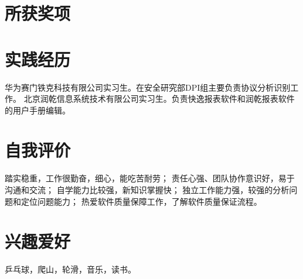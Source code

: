 \documentclass[a4paper]{moderncv}
\begin{document}
\begin{CJK*}{UTF8}{gbsn}
\section{所获奖项}
\section{实践经历}
{华为赛门铁克科技有限公司实习生。在安全研究部DPI组主要负责协议分析识别工作。}
{ 北京润乾信息系统技术有限公司实习生。负责快逸报表软件和润乾报表软件的用户手册编辑。 }

\section{自我评价}
\cvitem{}{}
{
踏实稳重，工作很勤奋，细心，能吃苦耐劳；
责任心强、团队协作意识好，易于沟通和交流；
自学能力比较强，新知识掌握快；
独立工作能力强，较强的分析问题和定位问题能力；
热爱软件质量保障工作，了解软件质量保证流程。
}

\section{兴趣爱好}
\cvitem{}
{
乒乓球，爬山，轮滑，音乐，读书。
}
\closesection
\end{CJK*}
\end{document}
